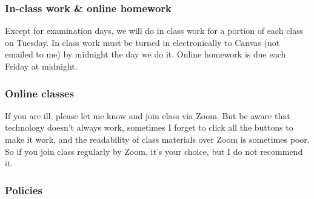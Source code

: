 \documentclass[12pt]{article}
\newcounter{ex}\setcounter{ex}{0}
\begin{document}
\subsubsection*{In-class work \& online homework}

Except for examination days, we will do in class work for a portion 
of each class on Tuesday. In class work must be turned in 
electronically to Canvas (not emailed to me) by midnight the day we 
do it. Online homework is due each Friday at midnight. 

\subsubsection*{Online classes}

If you are ill, please let me know and join class via Zoom. But 
be aware that technology doesn't always work, sometimes I forget to 
click all the buttons to make it work, and the readability of class 
materials over Zoom is sometimes poor. So if you join class regularly 
by Zoom, it's your choice, but I do not recommend it. 

\subsubsection* {Policies}
\end{document}
